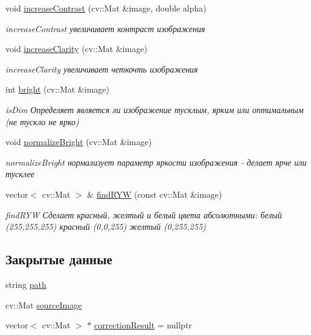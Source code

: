\begin{DoxyCompactItemize}
void \hyperlink{class_correction_adfc060f705da270932f1a8adec8ce567}{increase\+Contrast} (cv\+::\+Mat \&image, double alpha)
\begin{DoxyCompactList}\small\item\em increase\+Contrast увеличивает контраст изображения \end{DoxyCompactList}\item 
void \hyperlink{class_correction_ae9b87cadf876be9832d886fb44d913f2}{increase\+Clarity} (cv\+::\+Mat \&image)
\begin{DoxyCompactList}\small\item\em increase\+Clarity увеличивает четкочть изображения \end{DoxyCompactList}\item 
int \hyperlink{class_correction_ab414b82542d44827c55fd3e04e6696f7}{bright} (cv\+::\+Mat \&image)
\begin{DoxyCompactList}\small\item\em is\+Dim Определяет является ли изображение тусклым, ярким или оптимальным (не тускло не ярко) \end{DoxyCompactList}\item 
void \hyperlink{class_correction_a80784bcdd2ac906f3c06713540cc5a0c}{normalize\+Bright} (cv\+::\+Mat \&image)
\begin{DoxyCompactList}\small\item\em normalize\+Bright нормализует параметр яркости изображения -\/ делает ярче или тусклее \end{DoxyCompactList}\item 
vector$<$ cv\+::\+Mat $>$ \& \hyperlink{class_correction_a24fe63583741bbe777222015483d888a}{find\+R\+Y\+W} (const cv\+::\+Mat \&image)
\begin{DoxyCompactList}\small\item\em find\+R\+Y\+W Сделает красный, желтый и белый цвета абсолютными\+: белый (255,255,255) красный (0,0,255) желтый (0,255,255) \end{DoxyCompactList}\end{DoxyCompactItemize}
\subsection*{Закрытые данные}
\begin{DoxyCompactItemize}
\item 
string \hyperlink{class_correction_a6e1ccea5c33ea89d717d9227d17f625c}{path}
\item 
cv\+::\+Mat \hyperlink{class_correction_a1344ad4fb7d6a6346c2524e06feddd4b}{source\+Image}
\item 
vector$<$ cv\+::\+Mat $>$ $\ast$ \hyperlink{class_correction_a02fff781df4df45a3bb6f0a2484cafcc}{correction\+Result} = nullptr
\end{DoxyCompactItemize}


